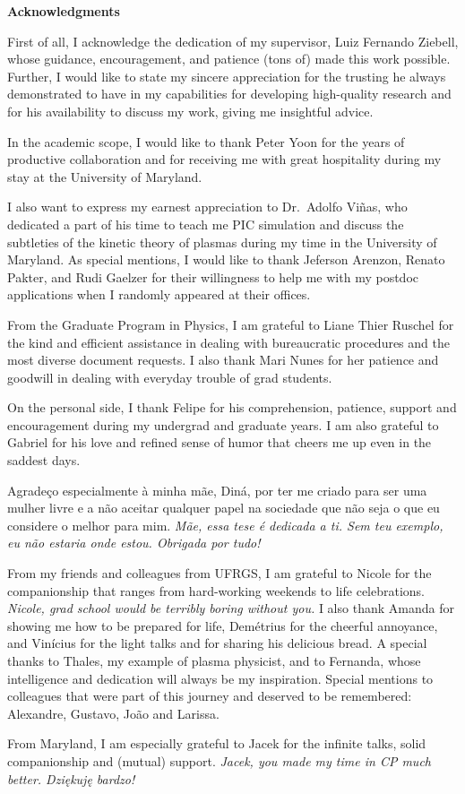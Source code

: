 \newpage
\pagestyle{empty}
\begin{center}
  \textbf{\large Acknowledgments}
\end{center}
  
First of all, I acknowledge the dedication of my supervisor, Luiz Fernando
Ziebell, whose guidance, encouragement, and patience (tons of) made this
work possible. Further, I would like to state my sincere appreciation for
the trusting he always demonstrated to have in my capabilities for developing
high-quality research and for his availability to discuss my work, giving me
insightful advice. 

In the academic scope, I would like to thank Peter Yoon for the years of
productive collaboration and for receiving me with great hospitality during
my stay at the University of Maryland.

I also want to express my earnest appreciation to Dr.~Adolfo Viñas, who
dedicated a part of his time to teach me PIC simulation and discuss the
subtleties of the kinetic theory of plasmas during my time in the University
of Maryland. As special mentions, I would like to thank Jeferson Arenzon,
Renato Pakter, and Rudi Gaelzer for their willingness to help me with my
postdoc applications when I randomly appeared at their offices.

From the Graduate Program in Physics, I am grateful to Liane Thier Ruschel for
the kind and efficient assistance in dealing with bureaucratic procedures and
the most diverse document requests. I also thank Mari Nunes for her patience
and goodwill in dealing with everyday trouble of grad students.

On the personal side, I thank Felipe for his comprehension, patience, support
and encouragement during my undergrad and graduate years. I am also grateful
to Gabriel for his love and refined sense of humor that cheers me up even in
the saddest days.

Agradeço especialmente à minha mãe, Diná, por ter me criado para ser uma
mulher livre e a não aceitar qualquer papel na sociedade que não seja o
que eu considere o melhor para mim. \emph{Mãe, essa tese é dedicada a ti.
  Sem teu exemplo, eu não estaria onde estou. Obrigada por tudo!}

From my friends and colleagues from UFRGS, I am grateful to Nicole for the
companionship that ranges from hard-working weekends to life celebrations.
\emph{Nicole, grad school would be terribly boring without you.} I also thank
Amanda for showing me how to be prepared for life, Demétrius for the cheerful
annoyance, and Vinícius for the light talks and for sharing his delicious
bread. A special thanks to Thales, my example of plasma physicist, and to
Fernanda, whose intelligence and dedication will always be my inspiration. 
Special mentions to colleagues that were part of this journey and deserved
to be remembered: Alexandre, Gustavo, João and Larissa.

From Maryland, I am especially grateful to Jacek for the infinite talks, solid
companionship and (mutual) support.\emph{ Jacek, you made my time in CP much
  better. Dziękuję bardzo!}






  
  
  


